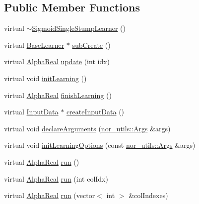 \subsection*{Public Member Functions}
\begin{DoxyCompactItemize}
\item 
virtual \hyperlink{classMultiBoost_1_1SigmoidSingleStumpLearner_afb4003421fd70feb31c413eb2161a552}{$\sim$SigmoidSingleStumpLearner} ()
\item 
virtual \hyperlink{classMultiBoost_1_1BaseLearner}{BaseLearner} $\ast$ \hyperlink{classMultiBoost_1_1SigmoidSingleStumpLearner_ae7196f2bf7c89953be0238c90ea9e1b1}{subCreate} ()
\item 
virtual \hyperlink{Defaults_8h_a80184c4fd10ab70a1a17c5f97dcd1563}{AlphaReal} \hyperlink{classMultiBoost_1_1SigmoidSingleStumpLearner_a6aefa8c67e0fd6ce354fdcf8cd2bfb2b}{update} (int idx)
\item 
virtual void \hyperlink{classMultiBoost_1_1SigmoidSingleStumpLearner_a3b03cf3c6993584e77c8880d4e41fb02}{initLearning} ()
\item 
virtual \hyperlink{Defaults_8h_a80184c4fd10ab70a1a17c5f97dcd1563}{AlphaReal} \hyperlink{classMultiBoost_1_1SigmoidSingleStumpLearner_aa7b20460f24fa5cf52bf666cb34627d2}{finishLearning} ()
\item 
virtual \hyperlink{classMultiBoost_1_1InputData}{InputData} $\ast$ \hyperlink{classMultiBoost_1_1SigmoidSingleStumpLearner_a90912a288d470c3b5adabbca4c124f86}{createInputData} ()
\item 
virtual void \hyperlink{classMultiBoost_1_1SigmoidSingleStumpLearner_aff4444f4cce780b47db79650b778b685}{declareArguments} (\hyperlink{classnor__utils_1_1Args}{nor\_\-utils::Args} \&args)
\item 
virtual void \hyperlink{classMultiBoost_1_1SigmoidSingleStumpLearner_a8681907af375892638d04f5429c7a3ee}{initLearningOptions} (const \hyperlink{classnor__utils_1_1Args}{nor\_\-utils::Args} \&args)
\item 
virtual \hyperlink{Defaults_8h_a80184c4fd10ab70a1a17c5f97dcd1563}{AlphaReal} \hyperlink{classMultiBoost_1_1SigmoidSingleStumpLearner_a5b78075ea6854a2cb4ea045f1f5b1eae}{run} ()
\item 
virtual \hyperlink{Defaults_8h_a80184c4fd10ab70a1a17c5f97dcd1563}{AlphaReal} \hyperlink{classMultiBoost_1_1SigmoidSingleStumpLearner_a2de201161cb87a94f61c33560a1932be}{run} (int colIdx)
\item 
virtual \hyperlink{Defaults_8h_a80184c4fd10ab70a1a17c5f97dcd1563}{AlphaReal} \hyperlink{classMultiBoost_1_1SigmoidSingleStumpLearner_a6226810a6656c8628ab25e398e605861}{run} (vector$<$ int $>$ \&colIndexes)

\end{DoxyCompactItemize}
